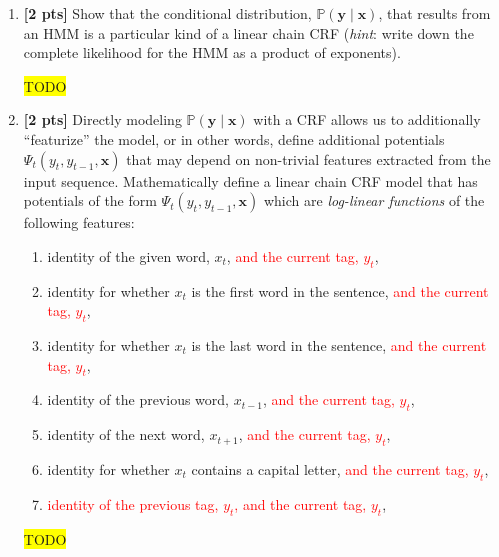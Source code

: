 \documentclass[10pt]{article}
\newcommand{\hilight}[1]{\colorbox{yellow}{#1}}
\begin{document}
\begin{enumerate}
    \item \textbf{[2 pts]} Show that the conditional distribution, $\mathbb{P}(\mathbf{y} \mid \mathbf{x})$, that results from an HMM is a particular kind of a linear chain CRF (\emph{hint}: write down the complete likelihood for the HMM as a product of exponents).

\begin{solution}
\hilight{TODO}
\end{solution}


    \item \textbf{[2 pts]} Directly modeling $\mathbb{P}(\mathbf{y} \mid \mathbf{x})$ with a CRF allows us to additionally ``featurize'' the model, or in other words, define additional potentials $\Psi_t(y_t, y_{t-1}, \mathbf{x})$ that may depend on non-trivial features extracted from the input sequence.
    Mathematically define a linear chain CRF model that has potentials of the form $\Psi_t(y_t, y_{t-1}, \mathbf{x})$ which are \emph{log-linear functions} of the following features:
    \begin{enumerate}
        \item identity of the given word, $x_t$, \textcolor{red}{and the current tag, $y_t$},
        \item identity for whether $x_t$ is the first word in the sentence, \textcolor{red}{and the current tag, $y_t$},
        \item identity for whether $x_t$ is the last word in the sentence, \textcolor{red}{and the current tag, $y_t$},
        \item identity of the previous word, $x_{t-1}$, \textcolor{red}{and the current tag, $y_t$},
        \item identity of the next word, $x_{t+1}$, \textcolor{red}{and the current tag, $y_t$},
        \item identity for whether $x_t$ contains a capital letter, \textcolor{red}{and the current tag, $y_t$},
        \item \textcolor{red}{identity of the previous tag, $y_t$, and the current tag, $y_t$},
    \end{enumerate}

\begin{solution}
\hilight{TODO}
\end{solution}


\end{enumerate}
\end{document}
